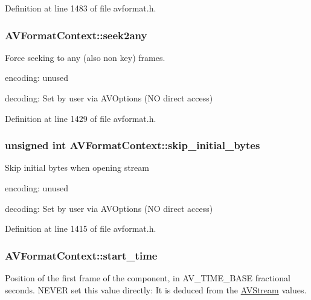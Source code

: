 Definition at line 1483 of file avformat.\+h.

\subsubsection[{\texorpdfstring{seek2any}{seek2any}}]{ A\+V\+Format\+Context\+::seek2any}\hypertarget{struct_a_v_format_context_a41a1f108aa38e851f65ff4f0a70ce5a5}{}\label{struct_a_v_format_context_a41a1f108aa38e851f65ff4f0a70ce5a5}
Force seeking to any (also non key) frames.
\begin{DoxyItemize}
\item encoding\+: unused
\item decoding\+: Set by user via A\+V\+Options (NO direct access) 
\end{DoxyItemize}

Definition at line 1429 of file avformat.\+h.

\subsubsection[{\texorpdfstring{skip\+\_\+initial\+\_\+bytes}{skip_initial_bytes}}]{\setlength{\rightskip}{0pt plus 5cm}unsigned {\bf int} A\+V\+Format\+Context\+::skip\+\_\+initial\+\_\+bytes}\hypertarget{struct_a_v_format_context_a168eb984d75525d3d86065fdbc96ced2}{}\label{struct_a_v_format_context_a168eb984d75525d3d86065fdbc96ced2}
Skip initial bytes when opening stream
\begin{DoxyItemize}
\item encoding\+: unused
\item decoding\+: Set by user via A\+V\+Options (NO direct access) 
\end{DoxyItemize}

Definition at line 1415 of file avformat.\+h.

\subsubsection[{\texorpdfstring{start\+\_\+time}{start_time}}]{ A\+V\+Format\+Context\+::start\+\_\+time}\hypertarget{struct_a_v_format_context_a2590129e00adfa726ab2033a10e905e9}{}\label{struct_a_v_format_context_a2590129e00adfa726ab2033a10e905e9}
Position of the first frame of the component, in A\+V\+\_\+\+T\+I\+M\+E\+\_\+\+B\+A\+SE fractional seconds. N\+E\+V\+ER set this value directly\+: It is deduced from the \hyperlink{struct_a_v_stream}{A\+V\+Stream} values.

